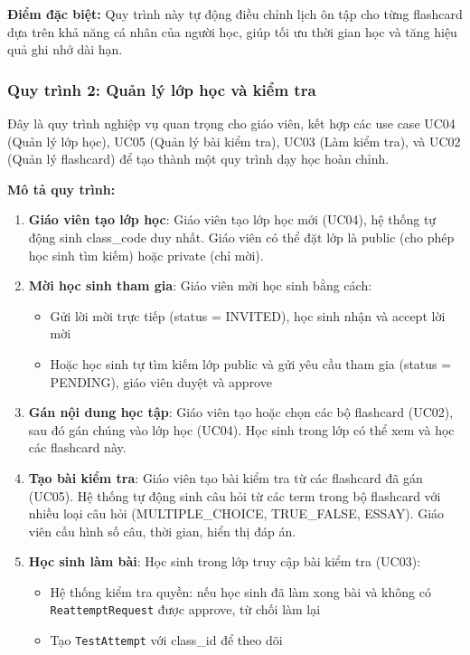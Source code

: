 \documentclass[../DoAn.tex]{subfiles}
\begin{document}
\textbf{Điểm đặc biệt:} Quy trình này tự động điều chỉnh lịch ôn tập cho từng flashcard dựa trên khả năng cá nhân của người học, giúp tối ưu thời gian học và tăng hiệu quả ghi nhớ dài hạn.

\subsubsection{Quy trình 2: Quản lý lớp học và kiểm tra}

Đây là quy trình nghiệp vụ quan trọng cho giáo viên, kết hợp các use case UC04 (Quản lý lớp học), UC05 (Quản lý bài kiểm tra), UC03 (Làm kiểm tra), và UC02 (Quản lý flashcard) để tạo thành một quy trình dạy học hoàn chỉnh.

\textbf{Mô tả quy trình:}
\begin{enumerate}
    \item \textbf{Giáo viên tạo lớp học}: Giáo viên tạo lớp học mới (UC04), hệ thống tự động sinh class\_code duy nhất. Giáo viên có thể đặt lớp là public (cho phép học sinh tìm kiếm) hoặc private (chỉ mời).
    \item \textbf{Mời học sinh tham gia}: Giáo viên mời học sinh bằng cách:
    \begin{itemize}
        \item Gửi lời mời trực tiếp (status = INVITED), học sinh nhận và accept lời mời
        \item Hoặc học sinh tự tìm kiếm lớp public và gửi yêu cầu tham gia (status = PENDING), giáo viên duyệt và approve
    \end{itemize}
    \item \textbf{Gán nội dung học tập}: Giáo viên tạo hoặc chọn các bộ flashcard (UC02), sau đó gán chúng vào lớp học (UC04). Học sinh trong lớp có thể xem và học các flashcard này.
    \item \textbf{Tạo bài kiểm tra}: Giáo viên tạo bài kiểm tra từ các flashcard đã gán (UC05). Hệ thống tự động sinh câu hỏi từ các term trong bộ flashcard với nhiều loại câu hỏi (MULTIPLE\_CHOICE, TRUE\_FALSE, ESSAY). Giáo viên cấu hình số câu, thời gian, hiển thị đáp án.
    \item \textbf{Học sinh làm bài}: Học sinh trong lớp truy cập bài kiểm tra (UC03):
    \begin{itemize}
        \item Hệ thống kiểm tra quyền: nếu học sinh đã làm xong bài và không có \texttt{ReattemptRequest} được approve, từ chối làm lại
        \item Tạo \texttt{TestAttempt} với class\_id để theo dõi

\end{itemize}
\end{enumerate}
\end{document}
